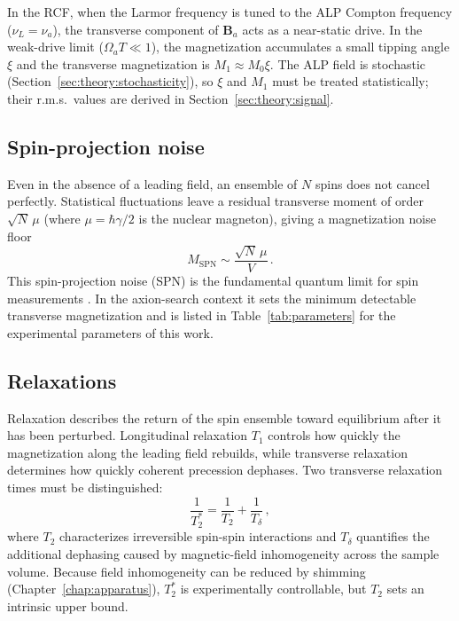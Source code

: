 In the RCF, when the Larmor frequency is tuned to the ALP Compton frequency ($\nu_L = \nu_a$), the transverse component of $\mathbf{B}_a$ acts as a near-static drive. In the weak-drive limit ($\Omega_a T \ll 1$), the magnetization accumulates a small tipping angle $\xi$ and the transverse magnetization is $M_1 \approx M_0\xi$. The ALP field is stochastic (Section~\ref{sec:theory:stochasticity}), so $\xi$ and $M_1$ must be treated statistically; their r.m.s.\ values are derived in Section~\ref{sec:theory:signal}.


\subsection{Spin-projection noise}\label{sec:NMR:SPN}
Even in the absence of a leading field, an ensemble of $N$ spins does not cancel perfectly. Statistical fluctuations leave a residual transverse moment of order $\sqrt{N}\,\mu$ (where $\mu = \hbar\gamma/2$ is the nuclear magneton), giving a magnetization noise floor
\begin{equation}
    M_\mathrm{SPN} \sim \frac{\sqrt{N}\,\mu}{V}
    \,.\label{eq:SPN}
\end{equation}
This spin-projection noise (SPN) is the fundamental quantum limit for spin measurements \cite{Mitchell2020_MagSensors}. In the axion-search context it sets the minimum detectable transverse magnetization and is listed in Table~\ref{tab:parameters} for the experimental parameters of this work.

\subsection{Relaxations}\label{sec:NMR:Relax}
Relaxation describes the return of the spin ensemble toward equilibrium after it has been perturbed. Longitudinal relaxation $T_1$ controls how quickly the magnetization along the leading field rebuilds, while transverse relaxation determines how quickly coherent precession dephases. Two transverse relaxation times must be distinguished:
\begin{equation}
    \frac{1}{T_2^*} = \frac{1}{T_2} + \frac{1}{T_\delta}
    \,,\label{eq:T2star}
\end{equation}
where $T_2$ characterizes irreversible spin-spin interactions and $T_\delta$ quantifies the additional dephasing caused by magnetic-field inhomogeneity across the sample volume. Because field inhomogeneity can be reduced by shimming (Chapter~\ref{chap:apparatus}), $T_2^*$ is experimentally controllable, but $T_2$ sets an intrinsic upper bound.


